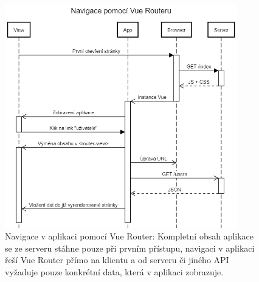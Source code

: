 \begin{figure}[]
\includegraphics[width=0.9\textwidth]{../png/diagrams/sequence-vue-router.png}
\caption[Navigace v aplikaci pomocí Vue Router]{Navigace v aplikaci pomocí Vue Router: Kompletní obsah aplikace se ze serveru stáhne pouze při prvním přístupu, navigaci v aplikaci řeší Vue Router přímo na klientu a od serveru či jiného API vyžaduje pouze konkrétní data, která v aplikaci zobrazuje.} \label{picture:route:vue}
\end{figure}






% 
% 
% 
% 
% 

